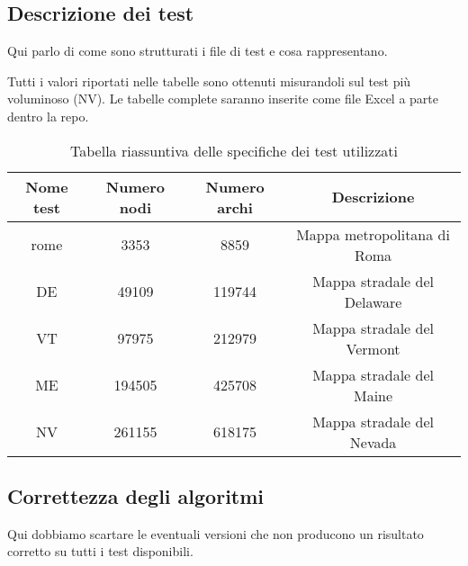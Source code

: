 \documentclass[a4paper]{article}
\begin{document}
	\subsection{Descrizione dei test}
	Qui parlo di come sono strutturati i file di test e cosa rappresentano.
	
	Tutti i valori riportati nelle tabelle sono ottenuti misurandoli sul test più voluminoso (NV). Le tabelle complete saranno inserite come file Excel a parte dentro la repo.
	\begin{table}[!ht]
		\centering
		\begin{tabular}{|c|c|c|c|}
			\hline
			\textbf{Nome test} & \textbf{Numero nodi} & \textbf{Numero archi} & \textbf{Descrizione} \\ \hline
			rome & 3353 & 8859 & Mappa metropolitana di Roma \\ \hline
			DE & 49109 & 119744 & Mappa stradale del Delaware \\ \hline
			VT & 97975 & 212979 & Mappa stradale del Vermont \\ \hline
			ME & 194505 & 425708 & Mappa stradale del Maine \\ \hline
			NV & 261155 & 618175 & Mappa stradale del Nevada \\ \hline
		\end{tabular}
		\label{tab:riassunto_test}
		\caption{Tabella riassuntiva delle specifiche dei test utilizzati}
	\end{table}

	\subsection{Correttezza degli algoritmi}
	Qui dobbiamo scartare le eventuali versioni che non producono un risultato corretto su tutti i test disponibili.
	
\end{document}
